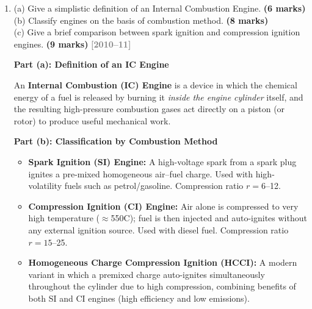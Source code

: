 \documentclass[12pt,a3paper]{article}
\newcommand{\yr}[1]{\hfill\textcolor{gray}{\small\textbf{[#1]}}}
\newcommand{\mk}[1]{\textcolor{orange!70!black}{\small\textbf{(#1 marks)}}}
\begin{document}
\begin{enumerate}
\begin{tcolorbox}[enhanced,breakable,ansbox,colback=cB!4,colframe=cB,
  boxrule=0.8pt,arc=5pt,
  title={\textbf{Answer}},fonttitle=\bfseries\color{white},colbacktitle=cB]
\textbf{Combined effect:} All three modifications together substantially increase
the thermal efficiency and specific work output. Their T-s diagram shows a more
rectangular cycle, approaching the Carnot efficiency.

\end{tcolorbox}

\item \label{qlabel:A2-Q15}
(a) Give a simplistic definition of an Internal Combustion Engine. \mk{6}\\
(b) Classify engines on the basis of combustion method. \mk{8}\\
(c) Give a brief comparison between spark ignition and compression ignition engines. \mk{9}
\yr{2010--11}

\begin{tcolorbox}[enhanced,breakable,ansbox,colback=cB!4,colframe=cB,
  boxrule=0.8pt,arc=5pt,
  title={\textbf{Answer}},fonttitle=\bfseries\color{white},colbacktitle=cB]

\textbf{Part (a): Definition of an IC Engine}

An \textbf{Internal Combustion (IC) Engine} is a device in which the chemical
energy of a fuel is released by burning it \emph{inside the engine cylinder}
itself, and the resulting high-pressure combustion gases act directly on a piston
(or rotor) to produce useful mechanical work.

\hrulefill

\textbf{Part (b): Classification by Combustion Method}

\begin{itemize}[leftmargin=1.5em,itemsep=3pt]
  \item \textbf{Spark Ignition (SI) Engine:} A high-voltage spark from a spark
        plug ignites a pre-mixed homogeneous air--fuel charge. Used with
        high-volatility fuels such as petrol/gasoline. Compression ratio
        $r = 6$--12.
  \item \textbf{Compression Ignition (CI) Engine:} Air alone is compressed to
        very high temperature ($\approx$550\textdegree C); fuel is then injected
        and auto-ignites without any external ignition source. Used with diesel
        fuel. Compression ratio $r = 15$--25.
  \item \textbf{Homogeneous Charge Compression Ignition (HCCI):} A modern
        variant in which a premixed charge auto-ignites simultaneously
        throughout the cylinder due to high compression, combining benefits of
        both SI and CI engines (high efficiency and low emissions).
\end{itemize}


\end{tcolorbox}
\end{enumerate}
\end{document}
